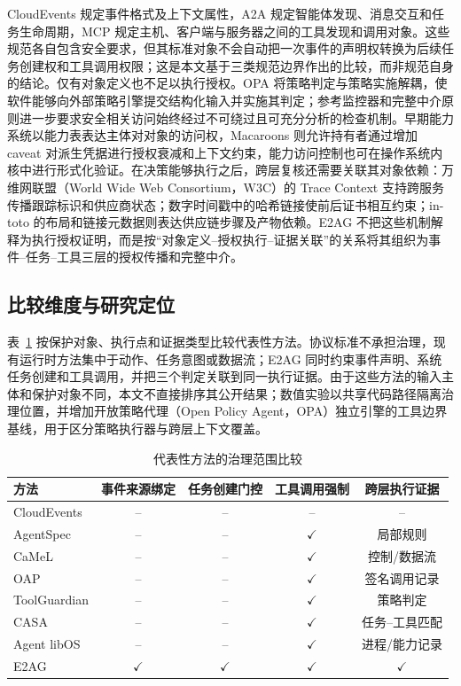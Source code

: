 CloudEvents 规定事件格式及上下文属性，A2A 规定智能体发现、消息交互和任务生命周期，MCP 规定主机、客户端与服务器之间的工具发现和调用对象\cite{cloudevents,a2a,mcp}。这些规范各自包含安全要求，但其标准对象不会自动把一次事件的声明权转换为后续任务创建权和工具调用权限；这是本文基于三类规范边界作出的比较，而非规范自身的结论。仅有对象定义也不足以执行授权。OPA 将策略判定与策略实施解耦，使软件能够向外部策略引擎提交结构化输入并实施其判定\cite{opa}；参考监控器和完整中介原则进一步要求安全相关访问始终经过不可绕过且可充分分析的检查机制\cite{reference-monitor,saltzer-schroeder}。早期能力系统以能力表表达主体对对象的访问权，Macaroons 则允许持有者通过增加 caveat 对派生凭据进行授权衰减和上下文约束，能力访问控制也可在操作系统内核中进行形式化验证\cite{dennis-capability,macaroons,cap-os}。在决策能够执行之后，跨层复核还需要关联其对象依赖：万维网联盟（World Wide Web Consortium，W3C）的 Trace Context 支持跨服务传播跟踪标识和供应商状态；数字时间戳中的哈希链接使前后证书相互约束；in-toto 的布局和链接元数据则表达供应链步骤及产物依赖\cite{trace-context,haber-stornetta,in-toto}。E2AG 不把这些机制解释为执行授权证明，而是按“对象定义--授权执行--证据关联”的关系将其组织为事件--任务--工具三层的授权传播和完整中介。

\subsection{比较维度与研究定位}

表~\ref{tab:related-scope-v11} 按保护对象、执行点和证据类型比较代表性方法。协议标准不承担治理，现有运行时方法集中于动作、任务意图或数据流；E2AG 同时约束事件声明、系统任务创建和工具调用，并把三个判定关联到同一执行证据。由于这些方法的输入主体和保护对象不同，本文不直接排序其公开结果；数值实验以共享代码路径隔离治理位置，并增加开放策略代理（Open Policy Agent，OPA）独立引擎的工具边界基线，用于区分策略执行器与跨层上下文覆盖。

\begin{table}[htbp]
\centering
\caption{代表性方法的治理范围比较}
\label{tab:related-scope-v11}
\small
\begin{tabular}{lcccc}
\toprule
方法 & 事件来源绑定 & 任务创建门控 & 工具调用强制 & 跨层执行证据 \\
\midrule
CloudEvents & -- & -- & -- & -- \\
AgentSpec & -- & -- & $\checkmark$ & 局部规则 \\
CaMeL & -- & -- & $\checkmark$ & 控制/数据流 \\
OAP & -- & -- & $\checkmark$ & 签名调用记录 \\
ToolGuardian & -- & -- & $\checkmark$ & 策略判定 \\
CASA & -- & -- & $\checkmark$ & 任务--工具匹配 \\
Agent libOS & -- & -- & $\checkmark$ & 进程/能力记录 \\
E2AG & $\checkmark$ & $\checkmark$ & $\checkmark$ & $\checkmark$ \\
\bottomrule
\end{tabular}
\end{table}

